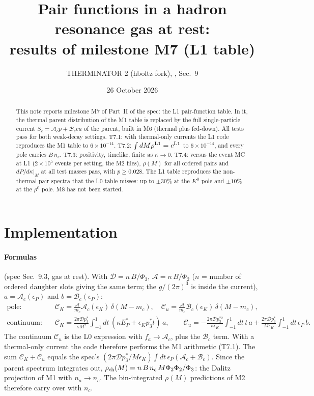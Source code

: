 \documentclass[11pt,a4paper]{article}
\title{Pair functions in a hadron resonance gas at rest:\\ results of milestone M7 (L1 table)}
\author{THERMINATOR 2 (hboltz fork), \code{src/work/hrg\_pair\_density\_spec.md}, Sec.~9}
\date{26 October 2026}
\newcommand{\CK}{\mathcal C_K}
\newcommand{\Cu}{\mathcal C_u}
\begin{document}
\maketitle

\begin{abstract}
\noindent
This note reports milestone M7 of Part~II of the spec: the L1 pair-function table. In it, the
thermal parent distribution of the M1 table is replaced by the full single-particle current
$S_c=\mathcal A_cp+\mathcal B_c\epsilon u$ of the parent, built in M6 (thermal plus fed-down). All
tests pass for both weak-decay settings. T7.1: with thermal-only currents the L1 code reproduces the
M1 table to $6\times10^{-14}$. T7.2: $\int dM\rho^{\rm L1}=c^{\rm L1}$ to $6\times10^{-14}$, and
every pole carries $B\,n_c$. T7.3: positivity, timelike, finite as $\kappa\to0$. T7.4: versus the
event MC at L1 ($2\times10^5$ events per setting, the M2 files), $\rho(M)$ for all ordered pairs and
$dP/d\kappa|_M$ at all test masses pass, with $p\ge0.028$. The L1 table reproduces the
non-thermal pair spectra that the L0 table misses: up to $\pm30\%$ at the $K^0$ pole and $\pm10\%$
at the $\rho^0$ pole. M8 has not been started.
\end{abstract}

\section{Implementation}
\paragraph{Formulas} (spec Sec.~9.3, gas at rest). With $\mathcal D=n\,B/\Phi_3$,
$\mathcal A=n\,B/\Phi_2$ ($n$ = number of ordered daughter slots giving the same term; the
$g/(2\pi)^3$ is inside the current), $a=\mathcal A_c(\epsilon_P)$ and $b=\mathcal B_c(\epsilon_P)$:
\begin{align*}
\text{pole:}&\quad \CK=\frac{\mathcal A}{m_c}\mathcal A_c(\epsilon_K)\,\delta(M-m_c),\quad
\Cu=\frac{\mathcal A}{m_c}\mathcal B_c(\epsilon_K)\,\delta(M-m_c),\\
\text{continuum:}&\quad \CK=\frac{2\pi\mathcal Dp_3^*}{\kappa M^2}\!\int_{-1}^1\!dt\,(\kappa E_P^*+\epsilon_Kp_3^*t)\,a,\qquad
\Cu=-\frac{2\pi\mathcal Dp_3^{*2}}{\kappa\epsilon_K}\!\int_{-1}^1\!dt\,t\,a+\frac{2\pi\mathcal Dp_3^*}{M\epsilon_K}\!\int_{-1}^1\!dt\,\epsilon_P\,b .
\end{align*}
The continuum $\Cu$ is the L0 expression with $f_a\to\mathcal A_c$, plus the $\mathcal B_c$ term. With
a thermal-only current the code therefore performs the M1 arithmetic (T7.1). The sum $\CK+\Cu$ equals
the spec's $(2\pi\mathcal Dp_3^*/M\epsilon_K)\int dt\,\epsilon_P(\mathcal A_c+\mathcal B_c)$. Since
the parent spectrum integrates out, $\rho_{\rm ch}(M)=n\,B\,n_c\,M\Phi_2\Phi_2/\Phi_3$: the Dalitz
projection of M1 with $n_a\to n_c$. The bin-integrated $\rho(M)$ predictions of M2 therefore carry
over with $n_c$.
\end{document}
